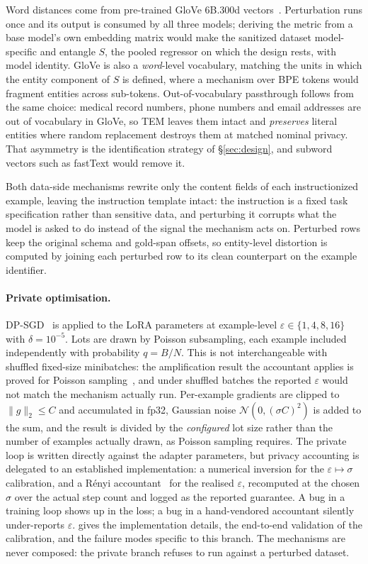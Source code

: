 Word distances come from pre-trained GloVe 6B.300d vectors~\citep{pennington2014glove}.
Perturbation runs once and its output is consumed by all three models;
deriving the metric from a base model's own embedding matrix would make the sanitized dataset model-specific and entangle $S$,
the pooled regressor on which the design rests,
with model identity.
GloVe is also a \textit{word}-level vocabulary,
matching the units in which the entity component of $S$ is defined,
where a mechanism over BPE tokens would fragment entities across sub-tokens.
Out-of-vocabulary passthrough follows from the same choice:
medical record numbers, phone numbers and email addresses are out of vocabulary in GloVe,
so TEM leaves them intact and \textit{preserves} literal entities where random replacement destroys them at matched nominal privacy.
That asymmetry is the identification strategy of \S\ref{sec:design},
and subword vectors such as fastText would remove it.

Both data-side mechanisms rewrite only the content fields of each instructionized example,
leaving the instruction template intact:
the instruction is a fixed task specification rather than sensitive data,
and perturbing it corrupts what the model is asked to do instead of the signal the mechanism acts on.
Perturbed rows keep the original schema and gold-span offsets,
so entity-level distortion is computed by joining each perturbed row to its clean counterpart on the example identifier.

\paragraph{Private optimisation.}
DP-SGD~\citep{abadi2016deep} is applied to the LoRA parameters at example-level $\varepsilon \in \{1, 4, 8, 16\}$ with $\delta = 10^{-5}$.
Lots are drawn by Poisson subsampling,
each example included independently with probability $q = B/N$.
This is not interchangeable with shuffled fixed-size minibatches:
the amplification result the accountant applies is proved for Poisson sampling~\citep{mironov2019sgm},
and under shuffled batches the reported $\varepsilon$ would not match the mechanism actually run.
Per-example gradients are clipped to $\lVert g \rVert_2 \le C$ and accumulated in fp32,
Gaussian noise $\mathcal{N}(0, (\sigma C)^2)$ is added to the sum,
and the result is divided by the \textit{configured} lot size rather than the number of examples actually drawn,
as Poisson sampling requires.
The private loop is written directly against the adapter parameters,
but privacy accounting is delegated to an established implementation:
a numerical inversion for the $\varepsilon \mapsto \sigma$ calibration,
and a R\'enyi accountant~\citep{mironov2017renyi} for the realised $\varepsilon$,
recomputed at the chosen $\sigma$ over the actual step count and logged as the reported guarantee.
A bug in a training loop shows up in the loss;
a bug in a hand-vendored accountant silently under-reports $\varepsilon$.
 gives the implementation details,
the end-to-end validation of the calibration,
and the failure modes specific to this branch.
The mechanisms are never composed:
the private branch refuses to run against a perturbed dataset.

